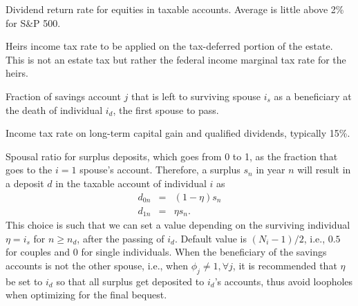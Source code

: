 \documentclass{report}[fleqn,11pt]
\begin{document}
\begin{description}[leftmargin=4em,style=multiline]
	Dividend return rate for equities in taxable accounts. Average is little above 2\% for S\&P 500.
\item [$\nu$]
	Heirs income tax rate to be applied on the tax-deferred portion of the estate. This is not an estate tax
	but rather the federal income marginal tax rate for the heirs.
\item [$\phi_j$]
	Fraction of savings account $j$ that is left to surviving spouse $i_s$ as a beneficiary
	at the death of individual $i_d$, the first spouse to pass.
\item [$\psi$]
	Income tax rate on long-term capital gain and qualified dividends, typically 15\%.
\item [$\eta$]
	Spousal ratio for surplus deposits, which goes from 0 to 1, as the fraction
	that goes to the $i = 1$ spouse's account. Therefore, a surplus $s_n$ in year $n$
	will result in a deposit $d$ in the taxable account of individual $i$ as
	\begin{eqnarray}
		\label{Eq:eta}
		d_{0n} & = & (1 - \eta) s_n \nonumber\\
		d_{1n} & = & \eta s_n.
	\end{eqnarray}
	This choice is such that we can set a value depending on the surviving
	individual $\eta = i_s$ for $n \ge n_d$, after the passing of $i_d$.
	Default value is $(N_i - 1)/2$, i.e., $0.5$ for couples and $0$ for single individuals.
	When the beneficiary of the savings accounts is not the other spouse, i.e., 
	when $\phi_j \neq 1, \forall j$, it is recommended that $\eta$ be set to $i_d$ so that
	all surplus get deposited to $i_d$'s accounts,
	thus avoid loopholes when optimizing for the final bequest.

\end{description}
\end{document}
